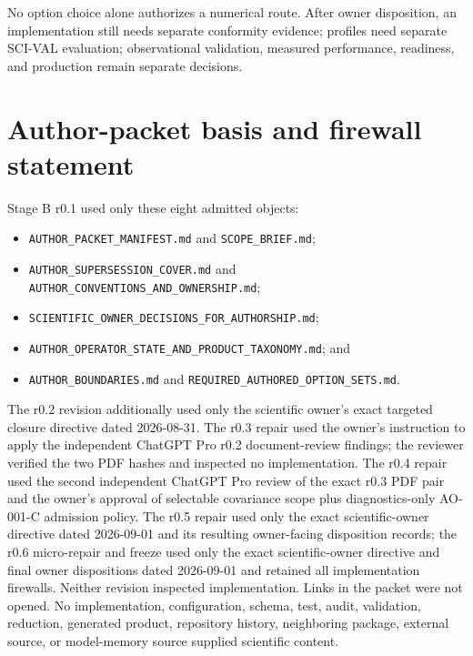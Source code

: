 \documentclass[11pt]{article}
\begin{document}
No option choice alone authorizes a numerical route. After owner disposition,
an implementation still needs separate conformity evidence; profiles need
separate SCI-VAL evaluation; observational validation, measured performance,
readiness, and production remain
separate decisions.

\appendix
\section{Author-packet basis and firewall statement}

Stage B r0.1 used only these eight admitted objects:
\begin{itemize}
\item \nolinkurl{AUTHOR_PACKET_MANIFEST.md} and \nolinkurl{SCOPE_BRIEF.md};
\item \nolinkurl{AUTHOR_SUPERSESSION_COVER.md} and
  \nolinkurl{AUTHOR_CONVENTIONS_AND_OWNERSHIP.md};
\item \nolinkurl{SCIENTIFIC_OWNER_DECISIONS_FOR_AUTHORSHIP.md};
\item \nolinkurl{AUTHOR_OPERATOR_STATE_AND_PRODUCT_TAXONOMY.md}; and
\item \nolinkurl{AUTHOR_BOUNDARIES.md} and
  \nolinkurl{REQUIRED_AUTHORED_OPTION_SETS.md}.
\end{itemize}
The r0.2 revision additionally used only the scientific owner's exact targeted
closure directive dated 2026-08-31. The r0.3 repair used the owner's instruction
to apply the independent ChatGPT Pro r0.2 document-review findings; the reviewer
verified the two PDF hashes and inspected no implementation. The r0.4 repair
used the second independent ChatGPT Pro review of the exact r0.3 PDF pair and
the owner's approval of selectable covariance scope plus diagnostics-only
AO-001-C admission policy. The r0.5 repair used only the exact scientific-owner
directive dated 2026-09-01 and its resulting owner-facing disposition records;
the r0.6 micro-repair and freeze used only the exact scientific-owner directive
and final owner dispositions dated 2026-09-01 and retained all implementation
firewalls. Neither revision
inspected implementation. Links in the
packet were not opened. No
implementation, configuration, schema, test, audit, validation,
reduction, generated product, repository history, neighboring package,
external source, or model-memory source supplied scientific content.
\end{document}
